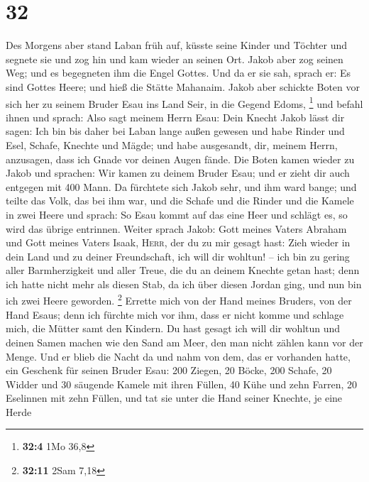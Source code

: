 \hypertarget{section-7}{%
\section{32}\label{section-7}}

 Des Morgens aber stand Laban früh auf, küsste seine
Kinder und Töchter und segnete sie und zog hin und kam wieder an seinen
Ort.  Jakob aber zog seinen Weg; und es begegneten ihm die
Engel Gottes.  Und da er sie sah, sprach er: Es sind
Gottes Heere; und hieß die Stätte Mahanaim.  Jakob aber
schickte Boten vor sich her zu seinem Bruder Esau ins Land Seir, in die
Gegend Edoms, \footnote{\textbf{32:4} 1Mo 36,8}  und
befahl ihnen und sprach: Also sagt meinem Herrn Esau: Dein Knecht Jakob
lässt dir sagen: Ich bin bis daher bei Laban lange außen gewesen
 und habe Rinder und Esel, Schafe, Knechte und Mägde; und
habe ausgesandt, dir, meinem Herrn, anzusagen, dass ich Gnade vor deinen
Augen fände.  Die Boten kamen wieder zu Jakob und
sprachen: Wir kamen zu deinem Bruder Esau; und er zieht dir auch
entgegen mit 400 Mann.  Da fürchtete sich Jakob sehr, und
ihm ward bange; und teilte das Volk, das bei ihm war, und die Schafe und
die Rinder und die Kamele in zwei Heere  und sprach: So
Esau kommt auf das eine Heer und schlägt es, so wird das übrige
entrinnen.  Weiter sprach Jakob: Gott meines Vaters
Abraham und Gott meines Vaters Isaak, \textsc{Herr}, der du zu mir
gesagt hast: Zieh wieder in dein Land und zu deiner Freundschaft, ich
will dir wohltun! --  ich bin zu gering aller
Barmherzigkeit und aller Treue, die du an deinem Knechte getan hast;
denn ich hatte nicht mehr als diesen Stab, da ich über diesen Jordan
ging, und nun bin ich zwei Heere geworden. \footnote{\textbf{32:11} 2Sam
  7,18}  Errette mich von der Hand meines Bruders, von
der Hand Esaus; denn ich fürchte mich vor ihm, dass er nicht komme und
schlage mich, die Mütter samt den Kindern.  Du hast
gesagt ich will dir wohltun und deinen Samen machen wie den Sand am
Meer, den man nicht zählen kann vor der Menge.  Und er
blieb die Nacht da und nahm von dem, das er vorhanden hatte, ein
Geschenk für seinen Bruder Esau:  200 Ziegen, 20 Böcke,
200 Schafe, 20 Widder  und 30 säugende Kamele mit ihren
Füllen, 40 Kühe und zehn Farren, 20 Eselinnen mit zehn Füllen,
 und tat sie unter die Hand seiner Knechte, je eine Herde
